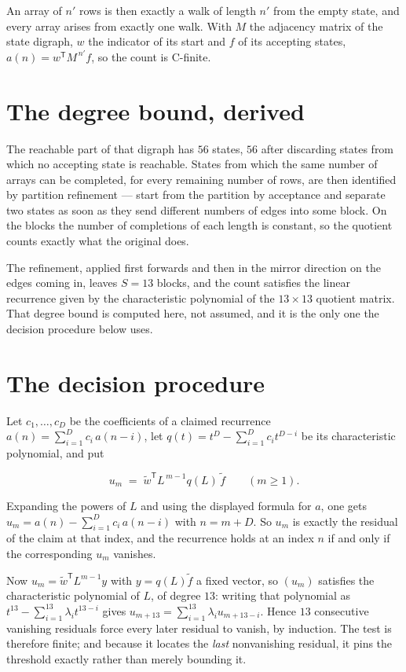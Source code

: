 \documentclass[11pt]{article}
\theoremstyle{definition}
\begin{document}
An array of $n'$ rows is then exactly a walk of length $n'$ from the empty state, and every array arises from exactly one walk. With $M$ the adjacency matrix of the state digraph, $w$ the indicator of its start and $f$ of its accepting states, $a(n) = w^{\mathsf T}M^{\,n'}f$, so the count is C-finite.

\section{The degree bound, derived}

The reachable part of that digraph has $56$ states, $56$ after discarding states from which no accepting state is reachable. States from which the same number of arrays can be completed, for every remaining number of rows, are then identified by partition refinement --- start from the partition by acceptance and separate two states as soon as they send different numbers of edges into some block. On the blocks the number of completions of each length is constant, so the quotient counts exactly what the original does.

The refinement, applied first forwards and then in the mirror direction on the edges coming in, leaves $S = 13$ blocks, and the count satisfies the linear recurrence given by the characteristic polynomial of the $13 \times 13$ quotient matrix. That degree bound is computed here, not assumed, and it is the only one the decision procedure below uses.

\section{The decision procedure}

Let $c_1,\dots,c_D$ be the coefficients of a claimed recurrence $a(n) = \sum_{i=1}^{D} c_i\,a(n-i)$, let $q(t) = t^{D} - \sum_{i=1}^{D} c_i t^{D-i}$ be its characteristic polynomial, and put

\[u_m \;=\; \tilde w^{\mathsf T} L^{\,m-1} q(L)\,\tilde f \qquad (m \ge 1).\]

Expanding the powers of $L$ and using the displayed formula for $a$, one gets $u_m = a(n) - \sum_{i=1}^{D} c_i\,a(n-i)$ with $n = m + D$. So $u_m$ is exactly the residual of the claim at that index, and the recurrence holds at an index $n$ if and only if the corresponding $u_m$ vanishes.

Now $u_m = \tilde w^{\mathsf T} L^{m-1} y$ with $y = q(L)\tilde f$ a fixed vector, so $(u_m)$ satisfies the characteristic polynomial of $L$, of degree $13$: writing that polynomial as $t^{13} - \sum_{i=1}^{13} \lambda_i t^{13-i}$ gives $u_{m+13} = \sum_{i=1}^{13} \lambda_i u_{m+13-i}$. Hence $13$ consecutive vanishing residuals force every later residual to vanish, by induction. The test is therefore finite; and because it locates the {\itshape last} nonvanishing residual, it pins the threshold exactly rather than merely bounding it.
\end{document}
